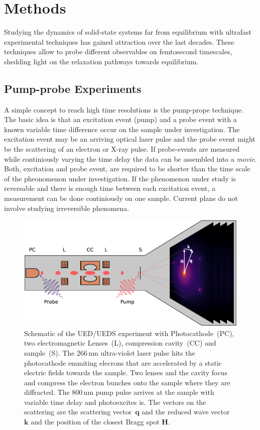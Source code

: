 \section{Methods}
Studying the dynamics of solid-state systems far from equilibrium with ultrafast experimental techniques has gained attraction over the last decades.
These techniques allow to probe different observables on femtosecond timescales, shedding light on the relaxation pathways towards equilibrium.

\subsection{Pump-probe Experiments}
A simple concept to reach high time resolutions is the pump-prope technique.
The basic idea is that an excitation event (pump) and a probe event with a known variable time difference occur on the sample under investigation.
The excitation event may be an arriving optical laser pulse and the probe event might be the scattering of an electron or X-ray pulse.
If probe-events are measured while continiously varying the time delay the data can be assembled into a \emph{movie}.
Both, excitation and probe event, are required to be shorter than the time scale of the pheonomenon under investigation.
If the phenomenon under study is reversable and there is enough time between each excitation event, a measurement can be done continiously on one sample.
Current plans do not involve studying irreversible phenomena.

\begin{figure}[!t]
	\includegraphics[width=\columnwidth]{figs/ued.pdf}
	\caption{Schematic of the UED/UEDS experiment with Photocathode~(PC), two electromagnetic Lenses~(L), compression cavity~(CC) and sample~(S). The 266\,nm ultra-violet laser pulse hits the photocathode emmiting elecrons that are accelerated by a static electric fields towards the sample. Two lenses and the cavity focus and compress the electron bunches onto the sample where they are diffracted. The 800\,nm pump pulse arrives at the sample with variable time delay and photoexcites is. The vectors on the scattering are the scattering vector~$\mathbf{q}$ and the reduced wave vector~$\mathbf{k}$ and the position of the closest Bragg spot $\mathbf{H}$.}
	\label{fig:ued}
\end{figure}

